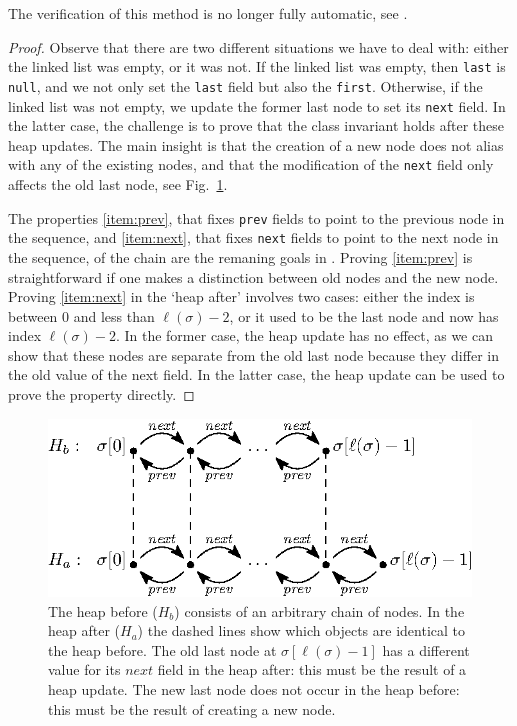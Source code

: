 \documentclass[runningheads]{llncs}
\begin{document}


The verification of this method is no longer fully automatic, see .

\begin{proof}
Observe that there are two different situations we have to deal with: either the linked list was empty, or it was not. If the linked list was empty, then \texttt{last} is \texttt{null}, and we not only set the \texttt{last} field but also the \texttt{first}. Otherwise, if the linked list was not empty, we update the former last node to set its \texttt{next} field. In the latter case, the challenge is to prove that the class invariant holds after these heap updates. The main insight is that the creation of a new node does not alias with any of the existing nodes, and that the modification of the \texttt{next} field only affects the old last node, see Fig.~\ref{fig:linklast}.

The properties \ref{item:prev}, that fixes \texttt{prev} fields to point to the previous node in the sequence, and \ref{item:next}, that fixes \texttt{next} fields to point to the next node in the sequence, of the chain are the remaning goals in . Proving \ref{item:prev} is straightforward if one makes a distinction between old nodes and the new node. Proving \ref{item:next} in the `heap after' involves two cases: either the index is between $0$ and less than $\ell(\sigma)-2$, or it used to be the last node and now has index $\ell(\sigma)-2$. In the former case, the heap update has no effect, as we can show that these nodes are separate from the old last node because they differ in the old value of the next field. In the latter case, the heap update can be used to prove the property directly.
\end{proof}

\begin{figure}
   \centering
   \includegraphics[scale=0.425]{figures/linkedlist-linklast.eps}
   \caption{The heap before ($H_b$) consists of an arbitrary chain of nodes. In the heap after ($H_a$) the dashed lines show which objects are identical to the heap before. The old last node at $\sigma[\ell(\sigma)-1]$ has a different value for its $\mathit{next}$ field in the heap after: this must be the result of a heap update. The new last node does not occur in the heap before: this must be the result of creating a new node.}
   \vspace*{-6pt}
   \label{fig:linklast}
\end{figure}
\end{document}
